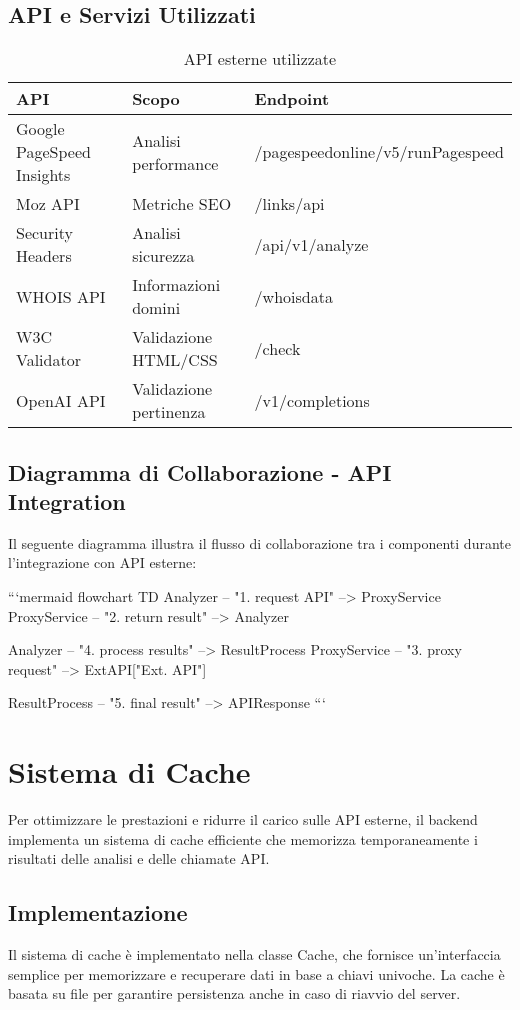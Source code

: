 \subsection{API e Servizi Utilizzati}
\begin{table}[H]
\centering
\begin{tabular}{|l|l|l|}
\hline
\textbf{API} & \textbf{Scopo} & \textbf{Endpoint} \\
\hline
Google PageSpeed Insights & Analisi performance & /pagespeedonline/v5/runPagespeed \\
\hline
Moz API & Metriche SEO & /links/api \\
\hline
Security Headers & Analisi sicurezza & /api/v1/analyze \\
\hline
WHOIS API & Informazioni domini & /whoisdata \\
\hline
W3C Validator & Validazione HTML/CSS & /check \\
\hline
\hline
OpenAI API & Validazione pertinenza & /v1/completions \\
\hline
\end{tabular}
\caption{API esterne utilizzate}
\label{table:api-services}
\end{table}

\subsection{Diagramma di Collaborazione - API Integration}
Il seguente diagramma illustra il flusso di collaborazione tra i componenti durante l'integrazione con API esterne:

```mermaid
flowchart TD
    Analyzer -- "1. request API" --> ProxyService
    ProxyService -- "2. return result" --> Analyzer
    
    Analyzer -- "4. process results" --> ResultProcess
    ProxyService -- "3. proxy request" --> ExtAPI["Ext. API"]
    
    ResultProcess -- "5. final result" --> APIResponse
```


\section{Sistema di Cache}
Per ottimizzare le prestazioni e ridurre il carico sulle API esterne, il backend implementa un sistema di cache efficiente che memorizza temporaneamente i risultati delle analisi e delle chiamate API.

\subsection{Implementazione}
Il sistema di cache è implementato nella classe Cache, che fornisce un'interfaccia semplice per memorizzare e recuperare dati in base a chiavi univoche. La cache è basata su file per garantire persistenza anche in caso di riavvio del server.

